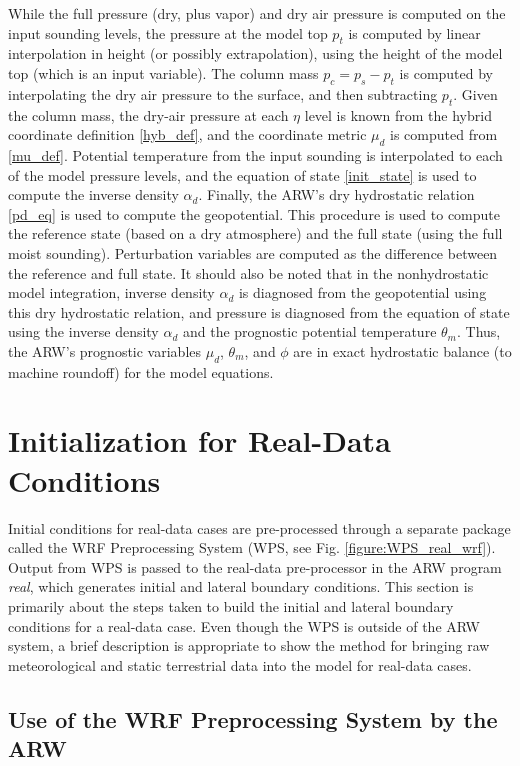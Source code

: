 While the full pressure (dry, plus vapor) and dry air pressure is
computed on the input sounding levels, the pressure at the model top $p_{t}$
is computed by linear interpolation in height (or possibly
extrapolation), using the height of the model top (which is an input variable).
The column mass $p_c=p_s-p_t$ is computed by interpolating the dry air
pressure to the surface, and then subtracting $p_{t}$.  Given the
column mass, the dry-air pressure at each $\eta$ level is known from the
hybrid coordinate definition \eqref{hyb_def}, and the coordinate metric 
$\mu_d$ is computed from \eqref{mu_def}.
Potential temperature from the input sounding is interpolated to
each of the model pressure levels, and the equation of state
\eqref{init_state} is used to compute the inverse density 
$\alpha_d$.  Finally, the 
ARW's dry hydrostatic relation \eqref{pd_eq}
is used to compute the geopotential.  This procedure is used to compute
the reference state (based on a dry atmosphere) and the full state
(using the full moist sounding).  Perturbation variables are
computed as the difference between the reference and full state.  It
should also be noted that in the nonhydrostatic model integration,
inverse density $\alpha_d$ is diagnosed from the geopotential using
this dry hydrostatic relation, and pressure is diagnosed from the equation
of state using the inverse density $\alpha_d$ and the prognostic potential
temperature $\theta_m$.  Thus, the ARW's prognostic variables $\mu_d$,
$\theta_m$, and $\phi$ are in exact hydrostatic balance (to machine roundoff) 
for the model equations.

\section{Initialization for Real-Data Conditions}
Initial conditions for real-data cases are pre-processed through a separate 
package called the WRF Preprocessing System (WPS, see Fig. \ref{figure:WPS_real_wrf}).  
Output from WPS is passed to the 
real-data pre-processor in the ARW program {\it real}, which generates initial and lateral boundary
conditions.  This section is primarily about the steps taken to build the
initial and lateral boundary conditions for a real-data case.  Even though the
WPS is outside of the ARW system, a brief description is appropriate to show the 
method for bringing raw meteorological and static terrestrial data into the model
for real-data cases.

\subsection{Use of the WRF Preprocessing System by the ARW}

